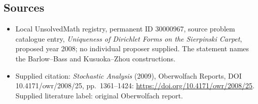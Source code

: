 \documentclass[11pt]{article}
\begin{document}
\subsection{Sources}
\begin{itemize}\item Local UnsolvedMath registry, permanent ID 30000967, source problem catalogue entry, \emph{Uniqueness of Dirichlet Forms on the Sierpinski Carpet}, proposed year 2008; no individual proposer supplied. The statement names the Barlow--Bass and Kusuoka--Zhou constructions.\item Supplied citation: \emph{Stochastic Analysis} (2009), Oberwolfach Reports, DOI 10.4171/owr/2008/25, pp.\ 1361--1424: \url{https://doi.org/10.4171/owr/2008/25}. Supplied literature label: original Oberwolfach report.\end{itemize}
\end{document}
